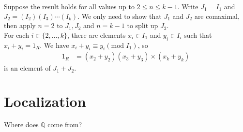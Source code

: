 \documentclass[10pt]{extarticle}
\newcommand{\Q}{\mathbb{Q}}
\begin{document}
  Suppose the result holds for all values up to $2\leq n \leq k-1$. Write $J_1 = I_1$ and $J_2 = (I_2)(I_3)\cdots(I_k)$. We only need to show that $J_1$ and $J_2$ are comaximal, then apply $n=2$ to $J_1,J_2$ and $n=k-1$ to split up $J_2$.\\

  For each $i\in \{2,\dots,k\}$, there are elements $x_i\in I_1$ and $y_i\in I_{i}$ such that $x_i + y_i = 1_R$. We have $x_i + y_i \equiv y_i (\text{mod } I_1)$, so
  \begin{align*}
   1_R &= (x_2 + y_2)(x_3 + y_3)\times(x_k + y_k)
  \end{align*}
  is an element of $J_1 + J_2$.
  \section{Localization}%
  Where does $\Q$ come from?\\
\end{document}
